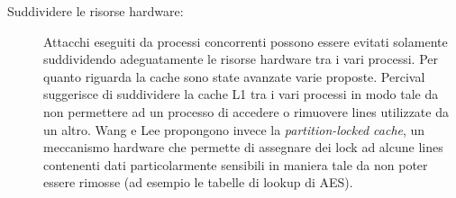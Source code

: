 \begin{description}
				\item[Suddividere le risorse hardware:] Attacchi eseguiti da processi concorrenti possono essere evitati solamente suddividendo adeguatamente le risorse hardware tra i vari processi. Per quanto riguarda la cache sono state avanzate varie proposte. Percival\cite{percival2005cache} suggerisce di suddividere la cache L1 tra i vari processi in modo tale da non permettere ad un processo di accedere o rimuovere lines utilizzate da un altro. Wang e Lee\cite{wang2007new} propongono invece la \emph{partition-locked cache}, un meccanismo hardware che permette di assegnare dei lock ad alcune lines contenenti dati particolarmente sensibili in maniera tale da non poter essere rimosse (ad esempio le tabelle di lookup di \ac{AES}).				 
			\end{description}